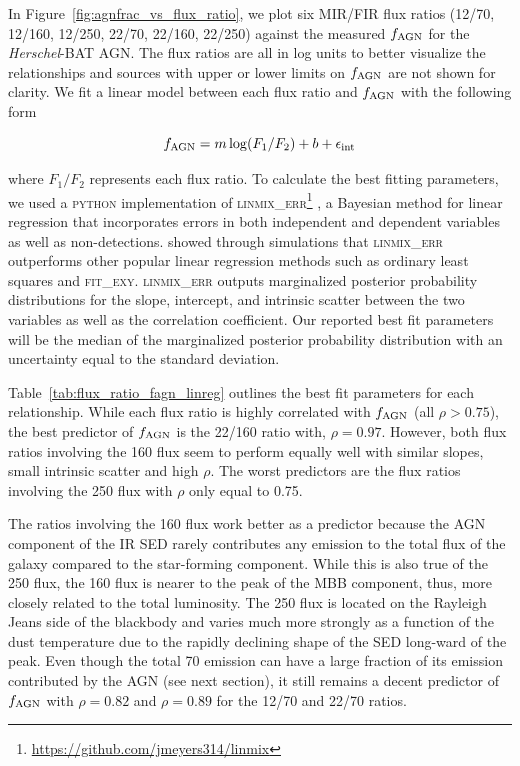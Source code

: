 \documentclass[fleqn, usenatbib]{mnras}
\newcommand{\herschel}{\emph{Herschel}}
\begin{document}
In Figure~\ref{fig:agnfrac_vs_flux_ratio}, we plot six MIR/FIR flux ratios (12/70, 12/160, 12/250, 22/70, 22/160, 22/250) against the measured $f_{\rm AGN}$ for the \herschel-BAT AGN. The flux ratios are all in log units to better visualize the relationships and sources with upper or lower limits on $f_{\rm AGN}$ are not shown for clarity. We fit a linear model between each flux ratio and $f_{\rm AGN}$ with the following form

\begin{equation}
f_{\rm AGN} = m\log(F_{1}/F_{2}) + b + \epsilon_{\rm int}
\end{equation}

\noindent where $F_{1}/F_{2}$ represents each flux ratio. To calculate the best fitting parameters, we used a \textsc{python} implementation of \textsc{linmix\_err}\footnote{\url{https://github.com/jmeyers314/linmix}} \citep{Kelly:2007lr}, a Bayesian method for linear regression that incorporates errors in both independent and dependent variables as well as non-detections. \citet{Kelly:2007lr} showed through simulations that \textsc{linmix\_err} outperforms other popular linear regression methods such as ordinary least squares and \textsc{fit\_exy}. \textsc{linmix\_err} outputs marginalized posterior probability distributions for the slope, intercept, and intrinsic scatter between the two variables as well as the correlation coefficient. Our reported best fit parameters will be the median of the marginalized posterior probability distribution with an uncertainty equal to the standard deviation.

Table~\ref{tab:flux_ratio_fagn_linreg} outlines the best fit parameters for each relationship. While each flux ratio is highly correlated with $f_{\rm AGN}$ (all $\rho > 0.75$), the best predictor of $f_{\rm AGN}$ is the 22/160 ratio with, $\rho = 0.97$. However, both flux ratios involving the 160 \micron{} flux seem to perform equally well with similar slopes, small intrinsic scatter and high $\rho$. The worst predictors are the flux ratios involving the 250 \micron{} flux with $\rho$ only equal to 0.75. 

The ratios involving the 160 \micron{} flux work better as a predictor because the AGN component of the IR SED rarely contributes any emission to the total flux of the galaxy compared to the star-forming component. While this is also true of the 250 \micron{} flux, the 160 \micron{} flux is nearer to the peak of the MBB component, thus, more closely related to the total luminosity. The 250 \micron{} flux is located on the Rayleigh Jeans side of the blackbody and varies much more strongly as a function of the dust temperature due to the rapidly declining shape of the SED long-ward of the peak. Even though the total 70 \micron{} emission can have a large fraction of its emission contributed by the AGN (see next section), it still remains a decent predictor of $f_{\rm AGN}$ with $\rho = 0.82$ and $\rho=0.89$ for the 12/70 and 22/70 \micron{} ratios. 
\end{document}

